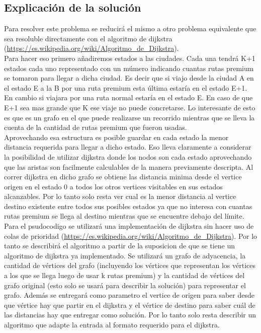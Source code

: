 \subsection{Explicación de la solución}

Para resolver este problema se reducirá el mismo a otro problema equivalente que sea resoluble directamente con el algoritmo de dijkstra (\url{https://es.wikipedia.org/wiki/Algoritmo_de_Dijkstra}). \\
Para hacer eso primero añadiremos estados a las ciudades. Cada una tendrá K+1 estados cada uno representado con un múmero indicando cuantas rutas premium se tomaron para llegar a dicha ciudad. Es decir que si viajo desde la ciudad A en el estado E a la B por una ruta premium esta última estaría en el estado E+1. En cambio si viajara por una ruta normal estaría en el estado E. En caso de que E+1 sea mas grande que K ese viaje no puede concretarse. Lo interesante de esto es que es un grafo en el que puede realizarse un recorrido mientras que se lleva la cuenta de la cantidad de rutas premium que fueron usadas.\\
Aprovechando esa estructura es posible guardar en cada estado la menor distancia requerida para llegar a dicho estado. Eso lleva claramente a considerar la posibilidad de utilizar dijkstra donde los nodos son cada estado aprovechando que las aristas son facilmente calculables de la manera previamente descripta. Al correr dijkstra en dicho grafo se obtiene las distancia minima desde el vertice origen en el estado 0 a todos  los otros vertices visitables en sus estados alcanzables. Por lo tanto solo resta ver cual es la menor distancia al vertice destino existente entre todos sus posibles estados ya que no interesa con cuantas rutas premium se llega al destino mientras que se encuentre debajo del límite.\\

Para el psudocodigo se utilizará una implementación de dijkstra sin hacer uso de colas de prioridad (\url{https://es.wikipedia.org/wiki/Algoritmo_de_Dijkstra}). Por lo tanto se describirá el algoritmo a partir de la suposicion de que se tiene un algoritmo de dijkstra ya implementado. Se utilizará un grafo de adyacencia, la cantidad de vértices del grafo (incluyendo los vértices que representan los vértices a los que se llega luego de usar k rutas premium) y la cantidad de vértices del grafo original (esto solo se usará para describir la solución) para representar el grafo. Además se entregará como parametro el vertice de origen para saber desde que vértice hay que partir en el dijkstra y el vértice de destino para saber cuál de las distancias hay que entregar como solución. Por lo tanto solo resta describir un algoritmo que adapte la entrada al formato requerido para el dijkstra.



